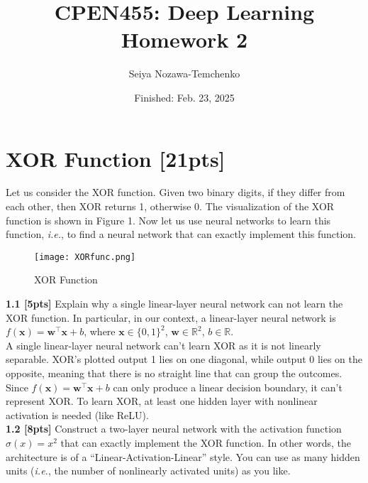 \documentclass{article}
\title{CPEN455: Deep Learning \\ Homework 2}
\author{Seiya Nozawa-Temchenko}
\date{Finished: Feb. 23, 2025}
\begin{document}
\pagestyle{fancy}
\fancyhead{} %

\maketitle
\thispagestyle{fancy}

\section{XOR Function [21pts]}
Let us consider the XOR function. Given two binary digits, if they differ from each other, then XOR returns 1, otherwise 0. The visualization of the XOR function is shown in Figure 1. Now let us use neural networks to learn this function, \textit{i.e.}, to find a neural network that can exactly implement this function.\\
\begin{figure}[h]
    \centering
    \texttt{[image: XORfunc.png]}
    \caption{XOR Function}
    \label{fig:xor}
\end{figure}

\noindent
\textbf{1.1 [5pts]}  Explain why a single linear-layer neural network can not learn the XOR function. In particular, in our context, a linear-layer neural network is $f(\mathbf{x})= \mathbf{w}^{\top} \mathbf{x}+ b$, where $\mathbf{x} \in \{0,1\}^2$, $\mathbf{w} \in \mathbb{R}^2$, $b \in \mathbb{R}$.\\

{\color{blue} 
A single linear-layer neural network can't learn XOR as it is not linearly separable. XOR's plotted output 1 lies on one diagonal, while output 0 lies on the opposite, meaning that there is no straight line that can group the outcomes. Since $f(\mathbf{x})= \mathbf{w}^{\top} \mathbf{x}+ b$ can only produce a linear decision boundary, it can't represent XOR. To learn XOR, at least one hidden layer with nonlinear activation is needed (like ReLU).} \\

\noindent
\textbf{1.2 [8pts]} Construct a two-layer neural network with the activation function $\sigma(x)= x^2$ that can exactly implement the XOR function. In other words, the architecture is of a “Linear-Activation-Linear” style. You can use as many hidden units (\textit{i.e.}, the number of nonlinearly activated units) as you like.\\
\end{document}
